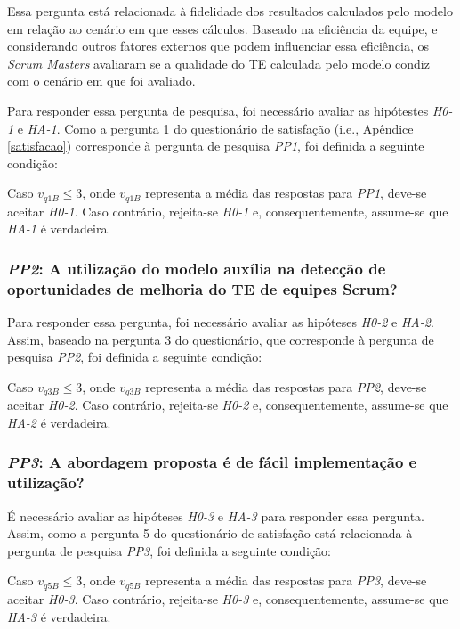 Essa pergunta está relacionada à fidelidade dos resultados calculados pelo modelo em relação ao cenário em que esses cálculos. Baseado na eficiência da equipe, e considerando outros fatores externos que podem influenciar essa eficiência, os \textit{Scrum Masters} avaliaram se a qualidade do TE calculada pelo modelo condiz com o cenário em que foi avaliado.

Para responder essa pergunta de pesquisa, foi necessário avaliar as hipótestes \textit{H0-1} e \textit{HA-1}. Como a pergunta 1 do questionário de satisfação (i.e., Apêndice \ref{satisfacao}) corresponde à pergunta de pesquisa \textit{PP1}, foi definida a seguinte condição:

Caso $v_{q1B} \le 3$, onde $v_{q1B}$ representa a média das respostas para \textit{PP1}, deve-se aceitar \textit{H0-1}. Caso contrário, rejeita-se \textit{H0-1} e, consequentemente, assume-se que \textit{HA-1} é verdadeira.

\subsubsection{\textit{PP2}: A utilização do modelo auxília na detecção de oportunidades de melhoria do TE de equipes Scrum?}

Para responder essa pergunta, foi necessário avaliar as hipóteses \textit{H0-2} e \textit{HA-2}. Assim, baseado na pergunta 3 do questionário, que corresponde à pergunta de pesquisa \textit{PP2}, foi definida a seguinte condição:

Caso $v_{q3B} \le 3$, onde $v_{q3B}$ representa a média das respostas para \textit{PP2}, deve-se aceitar \textit{H0-2}. Caso contrário, rejeita-se \textit{H0-2} e, consequentemente, assume-se que \textit{HA-2} é verdadeira.

\subsubsection{\textit{PP3}: A abordagem proposta é de fácil implementação e utilização?}

É necessário avaliar as hipóteses \textit{H0-3} e \textit{HA-3} para responder essa pergunta. Assim, como a pergunta 5 do questionário de satisfação está relacionada à pergunta de pesquisa \textit{PP3}, foi definida a seguinte condição:

Caso $v_{q5B} \le 3$, onde $v_{q5B}$ representa a média das respostas para \textit{PP3}, deve-se aceitar \textit{H0-3}. Caso contrário, rejeita-se \textit{H0-3} e, consequentemente, assume-se que \textit{HA-3} é verdadeira.

